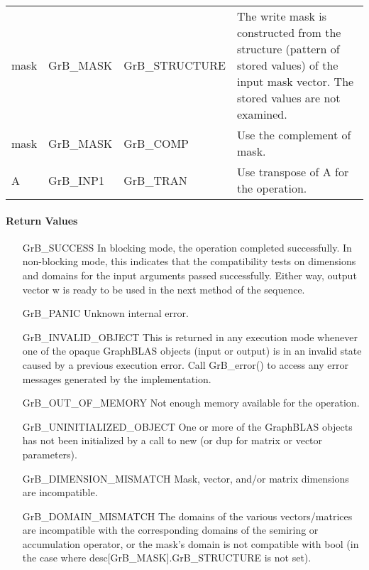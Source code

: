 \begin{itemize}[leftmargin=1.1in]
\begin{tabular}{lllp{2.7in}}
        {\sf mask} & {\sf GrB\_MASK} & {\sf GrB\_STRUCTURE}   & The write mask is
        constructed from the structure (pattern of stored values) of the input
        {\sf mask} vector. The stored values are not examined.\\

        {\sf mask} & {\sf GrB\_MASK} & {\sf GrB\_COMP}   & Use the
        complement of {\sf mask}. \\

        {\sf A}    & {\sf GrB\_INP1} & {\sf GrB\_TRAN}   & Use transpose of {\sf A}
        for the operation. \\
    \end{tabular}
\end{itemize}

\paragraph{Return Values}

\begin{itemize}[leftmargin=2.1in]
    \item[{\sf GrB\_SUCCESS}]         In blocking mode, the operation completed
    successfully. In non-blocking mode, this indicates that the compatibility 
    tests on dimensions and domains for the input arguments passed successfully. 
    Either way, output vector {\sf w} is ready to be used in the next method of 
    the sequence.

    \item[{\sf GrB\_PANIC}]           Unknown internal error.

    \item[{\sf GrB\_INVALID\_OBJECT}] This is returned in any execution mode 
    whenever one of the opaque GraphBLAS objects (input or output) is in an invalid 
    state caused by a previous execution error.  Call {\sf GrB\_error()} to access 
    any error messages generated by the implementation.

    \item[{\sf GrB\_OUT\_OF\_MEMORY}] Not enough memory available for the operation.

    \item[{\sf GrB\_UNINITIALIZED\_OBJECT}] One or more of the GraphBLAS objects 
    has not been initialized by a call to {\sf new} (or {\sf dup} for matrix or
    vector parameters).

    \item[{\sf GrB\_DIMENSION\_MISMATCH}] Mask, vector, and/or matrix 
    dimensions are incompatible.

    \item[{\sf GrB\_DOMAIN\_MISMATCH}]    The domains of the various vectors/matrices are
    incompatible with the corresponding domains of the semiring or
    accumulation operator, or the mask's domain is not compatible with {\sf bool}
    (in the case where {\sf desc[GrB\_MASK].GrB\_STRUCTURE} is not set).
\end{itemize}

